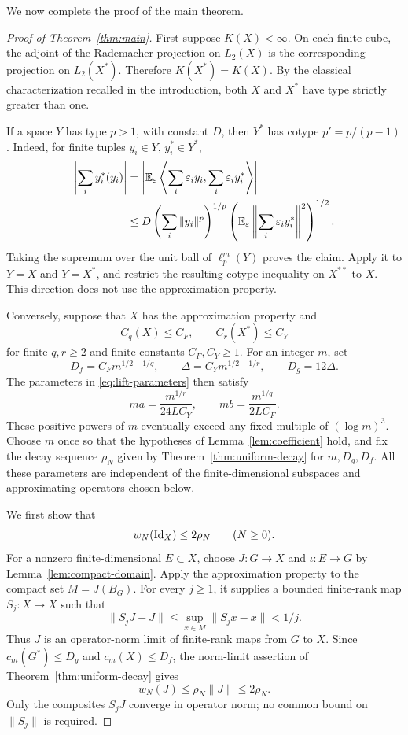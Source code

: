 We now complete the proof of the main theorem.

\begin{proof}[Proof of Theorem~\ref{thm:main}]
First suppose \(K(X)<\infty\).
On each finite cube, the adjoint of the Rademacher projection on
\(L_2(X)\) is the corresponding projection on \(L_2(X^*)\).
Therefore \(K(X^*)=K(X)\).
By the classical characterization recalled in the introduction,
both \(X\) and \(X^*\) have type strictly greater than one.

If a space \(Y\) has type \(p>1\), with constant \(D\), then \(Y^*\)
has cotype \(p'=p/(p-1)\).
Indeed, for finite tuples \(y_i\in Y\), \(y_i^*\in Y^*\),
\begin{align*}
\left|\sum_i y_i^*(y_i)\right|
&=\left|\mathbb E_\varepsilon
\left\langle\sum_i\varepsilon_i y_i,\sum_i\varepsilon_i y_i^*\right\rangle\right|\\
&\le D\left(\sum_i\|y_i\|^p\right)^{1/p}
\left(\mathbb E_\varepsilon\left\|\sum_i\varepsilon_i y_i^*\right\|^2\right)^{1/2}.
\end{align*}
Taking the supremum over the unit ball of \(\ell_p^m(Y)\) proves
the claim. Apply it to \(Y=X\) and \(Y=X^*\), and restrict the
resulting cotype inequality on \(X^{**}\) to \(X\).
This direction does not use the approximation property.

Conversely, suppose that \(X\) has the approximation property and
\[
C_q(X)\le C_F,\qquad C_r(X^*)\le C_Y
\]
for finite \(q,r\ge2\) and finite constants \(C_F,C_Y\ge1\).
For an integer \(m\), set
\[
D_f=C_Fm^{1/2-1/q},\qquad
\Delta=C_Ym^{1/2-1/r},\qquad D_g=12\Delta.
\]
The parameters in \eqref{eq:lift-parameters} then satisfy
\[
ma=\frac{m^{1/r}}{24LC_Y},\qquad
mb=\frac{m^{1/q}}{2LC_F}.
\]
These positive powers of \(m\) eventually exceed any fixed multiple
of \((\log m)^3\). Choose \(m\) once so that the hypotheses of
Lemma~\ref{lem:coefficient} hold, and fix the decay sequence \(\rho_N\)
given by Theorem~\ref{thm:uniform-decay} for \(m,D_g,D_f\).
All these parameters are independent of the finite-dimensional
subspaces and approximating operators chosen below.

We first show that
\begin{equation}\label{eq:identity-walsh-decay}
w_N(\mathrm{Id}_X)\le2\rho_N\qquad(N\ge0).
\end{equation}
For a nonzero finite-dimensional \(E\subset X\), choose
\(J:G\to X\) and \(\iota:E\to G\) by Lemma~\ref{lem:compact-domain}.
Apply the approximation property to the compact set
\(M=\overline{J(B_G)}\). For every \(j\ge1\), it supplies a bounded
finite-rank map \(S_j:X\to X\) such that
\[
\|S_jJ-J\|
\le\sup_{x\in M}\|S_jx-x\|<1/j.
\]
Thus \(J\) is an operator-norm limit of finite-rank maps from
\(G\) to \(X\). Since \(c_m(G^*)\le D_g\) and \(c_m(X)\le D_f\),
the norm-limit assertion of Theorem~\ref{thm:uniform-decay} gives
\begin{equation}\label{eq:compact-walsh-decay}
w_N(J)\le\rho_N\|J\|\le2\rho_N.
\end{equation}
Only the composites \(S_jJ\) converge in operator norm;
no common bound on \(\|S_j\|\) is required.


\end{proof}
